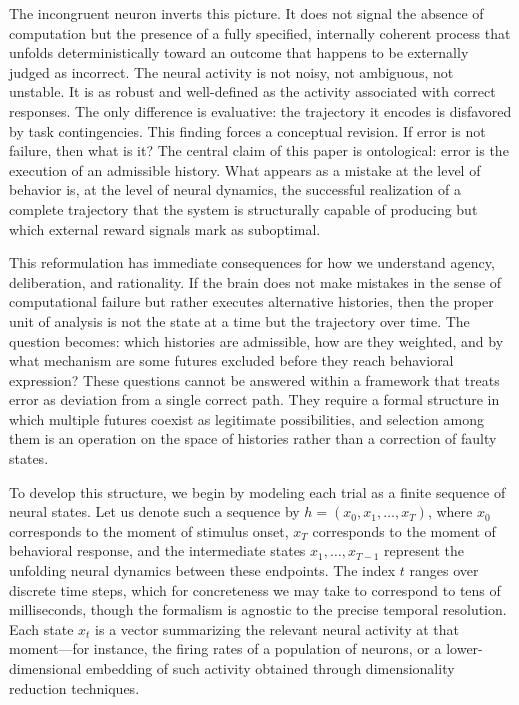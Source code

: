 \documentclass[11pt]{article}
\begin{document}
The incongruent neuron inverts this picture. It does not signal the absence of computation but the presence of a fully specified, internally coherent process that unfolds deterministically toward an outcome that happens to be externally judged as incorrect. The neural activity is not noisy, not ambiguous, not unstable. It is as robust and well-defined as the activity associated with correct responses. The only difference is evaluative: the trajectory it encodes is disfavored by task contingencies. This finding forces a conceptual revision. If error is not failure, then what is it? The central claim of this paper is ontological: error is the execution of an admissible history. What appears as a mistake at the level of behavior is, at the level of neural dynamics, the successful realization of a complete trajectory that the system is structurally capable of producing but which external reward signals mark as suboptimal.

This reformulation has immediate consequences for how we understand agency, deliberation, and rationality. If the brain does not make mistakes in the sense of computational failure but rather executes alternative histories, then the proper unit of analysis is not the state at a time but the trajectory over time. The question becomes: which histories are admissible, how are they weighted, and by what mechanism are some futures excluded before they reach behavioral expression? These questions cannot be answered within a framework that treats error as deviation from a single correct path. They require a formal structure in which multiple futures coexist as legitimate possibilities, and selection among them is an operation on the space of histories rather than a correction of faulty states.

To develop this structure, we begin by modeling each trial as a finite sequence of neural states. Let us denote such a sequence by $h = (x_0, x_1, \ldots, x_T)$, where $x_0$ corresponds to the moment of stimulus onset, $x_T$ corresponds to the moment of behavioral response, and the intermediate states $x_1, \ldots, x_{T-1}$ represent the unfolding neural dynamics between these endpoints. The index $t$ ranges over discrete time steps, which for concreteness we may take to correspond to tens of milliseconds, though the formalism is agnostic to the precise temporal resolution. Each state $x_t$ is a vector summarizing the relevant neural activity at that moment—for instance, the firing rates of a population of neurons, or a lower-dimensional embedding of such activity obtained through dimensionality reduction techniques.
\end{document}
